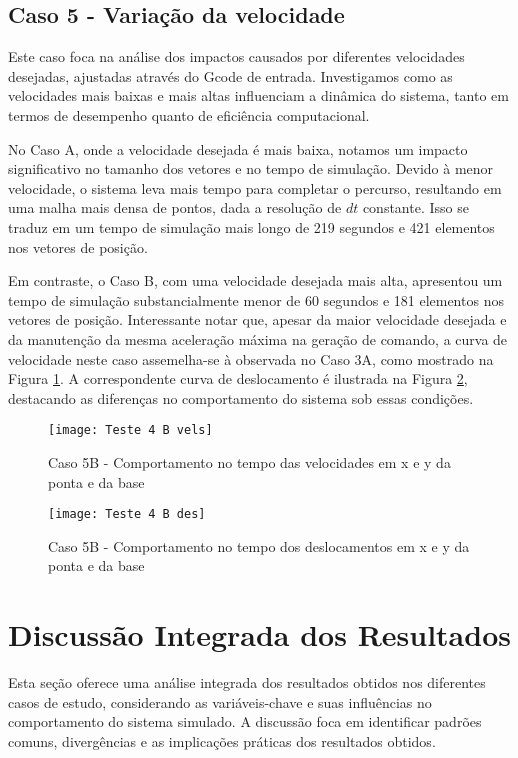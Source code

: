 \subsection{Caso 5 - Variação da velocidade}
Este caso foca na análise dos impactos causados por diferentes velocidades desejadas, ajustadas através do Gcode de entrada. Investigamos como as velocidades mais baixas e mais altas influenciam a dinâmica do sistema, tanto em termos de desempenho quanto de eficiência computacional.

No Caso A, onde a velocidade desejada é mais baixa, notamos um impacto significativo no tamanho dos vetores e no tempo de simulação. Devido à menor velocidade, o sistema leva mais tempo para completar o percurso, resultando em uma malha mais densa de pontos, dada a resolução de \(dt\) constante. Isso se traduz em um tempo de simulação mais longo de 219 segundos e 421 elementos nos vetores de posição.

Em contraste, o Caso B, com uma velocidade desejada mais alta, apresentou um tempo de simulação substancialmente menor de 60 segundos e 181 elementos nos vetores de posição. Interessante notar que, apesar da maior velocidade desejada e da manutenção da mesma aceleração máxima na geração de comando, a curva de velocidade neste caso assemelha-se à observada no Caso 3A, como mostrado na Figura \ref{fig:t_4b_vels}. A correspondente curva de deslocamento é ilustrada na Figura \ref{fig:t_4b_des}, destacando as diferenças no comportamento do sistema sob essas condições.

\begin{figure}[H]
    \begin{center}
    \caption{Caso 5B - Comportamento no tempo das velocidades em x e y da ponta e da base}
    \texttt{[image: Teste 4 B vels]}
    \label{fig:t_4b_vels}
    \end{center}
\end{figure}

\begin{figure}[H]
    \begin{center}
    \caption{Caso 5B - Comportamento no tempo dos deslocamentos em x e y da ponta e da base}
    \texttt{[image: Teste 4 B des]}
    \label{fig:t_4b_des}
    \end{center}
\end{figure}

\section{Discussão Integrada dos Resultados}
Esta seção oferece uma análise integrada dos resultados obtidos nos diferentes casos de estudo, considerando as variáveis-chave e suas influências no comportamento do sistema simulado. A discussão foca em identificar padrões comuns, divergências e as implicações práticas dos resultados obtidos.

